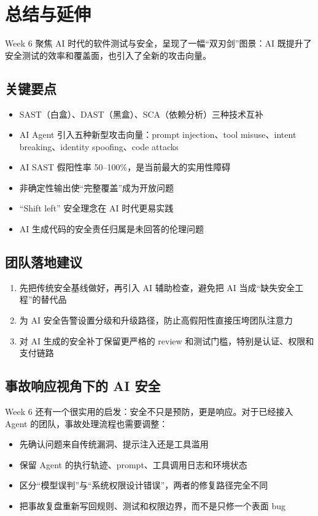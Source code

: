 \section{总结与延伸}

Week 6 聚焦 AI 时代的软件测试与安全，呈现了一幅``双刃剑''图景：AI 既提升了安全测试的效率和覆盖面，也引入了全新的攻击向量。

\subsection{关键要点}

\begin{itemize}
    \item SAST（白盒）、DAST（黑盒）、SCA（依赖分析）三种技术互补
    \item AI Agent 引入五种新型攻击向量：prompt injection、tool misuse、intent breaking、identity spoofing、code attacks
    \item AI SAST 假阳性率 50--100\%，是当前最大的实用性障碍
    \item 非确定性输出使``完整覆盖''成为开放问题
    \item ``Shift left'' 安全理念在 AI 时代更易实践
    \item AI 生成代码的安全责任归属是未回答的伦理问题
\end{itemize}

\subsection{团队落地建议}

\begin{enumerate}
    \item 先把传统安全基线做好，再引入 AI 辅助检查，避免把 AI 当成“缺失安全工程”的替代品
    \item 为 AI 安全告警设置分级和升级路径，防止高假阳性直接压垮团队注意力
    \item 对 AI 生成的安全补丁保留更严格的 review 和测试门槛，特别是认证、权限和支付链路
\end{enumerate}

\subsection{事故响应视角下的 AI 安全}

Week 6 还有一个很实用的启发：安全不只是预防，更是响应。对于已经接入 Agent 的团队，事故处理流程也需要调整：

\begin{itemize}
    \item 先确认问题来自传统漏洞、提示注入还是工具滥用
    \item 保留 Agent 的执行轨迹、prompt、工具调用日志和环境状态
    \item 区分“模型误判”与“系统权限设计错误”，两者的修复路径完全不同
    \item 把事故复盘重新写回规则、测试和权限边界，而不是只修一个表面 bug
\end{itemize}

